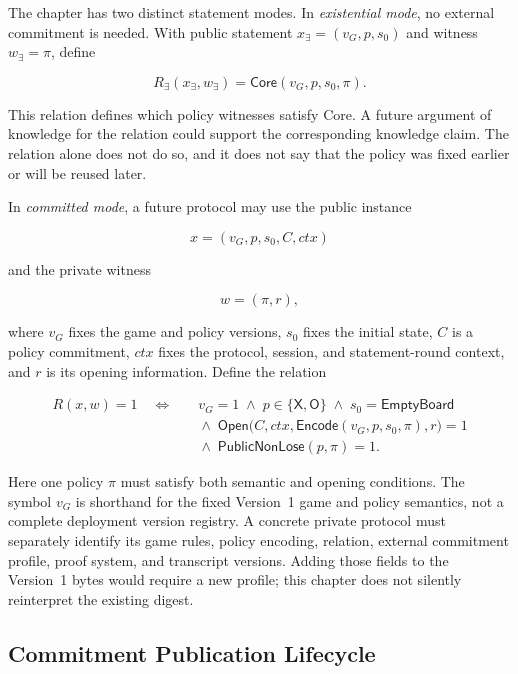 The chapter has two distinct statement modes. In \emph{existential mode}, no
external commitment is needed. With public statement
$x_{\exists}=(v_G,p,s_0)$ and witness $w_{\exists}=\pi$, define

\begin{equation}
\label{eq:ttt-existential-relation}
R_{\exists}(x_{\exists},w_{\exists})=
\mathsf{Core}(v_G,p,s_0,\pi).
\end{equation}

This relation defines which policy witnesses satisfy Core. A future argument
of knowledge for the relation could support the corresponding knowledge claim.
The relation alone does not do so, and it does not say that the policy was
fixed earlier or will be reused later.

In \emph{committed mode}, a future protocol may use the public instance

\[
 x=(v_G,p,s_0,C,\mathit{ctx})
\]

and the private witness

\[
 w=(\pi,r),
\]

where $v_G$ fixes the game and policy versions, $s_0$ fixes the initial state,
$C$ is a policy commitment, $\mathit{ctx}$ fixes the protocol, session, and
statement-round context, and $r$ is its opening information. Define the
relation

\begin{equation}
\label{eq:ttt-committed-policy-relation}
 \begin{aligned}
 R(x,w)=1 \quad\Longleftrightarrow\quad{}
 &v_G=1 \;\land\; p\in\{\mathsf{X},\mathsf{O}\}
     \;\land\; s_0=\mathsf{EmptyBoard} \\
 &{}\land\;\mathsf{Open}\bigl(C,\mathit{ctx},
     \mathsf{Encode}(v_G,p,s_0,\pi),r\bigr)=1 \\
 &{}\land\;\mathsf{PublicNonLose}(p,\pi)=1.
 \end{aligned}
\end{equation}

Here one policy $\pi$ must satisfy both semantic and opening conditions. The
symbol $v_G$ is shorthand for the fixed Version~1 game and policy semantics,
not a complete deployment version registry. A concrete private protocol must
separately identify its game rules, policy encoding, relation, external
commitment profile, proof system, and transcript versions. Adding those fields
to the Version~1 bytes would require a new profile; this chapter does not
silently reinterpret the existing digest.

\subsection{Commitment Publication Lifecycle}
\label{sec:ttt-commitment-lifecycle}

